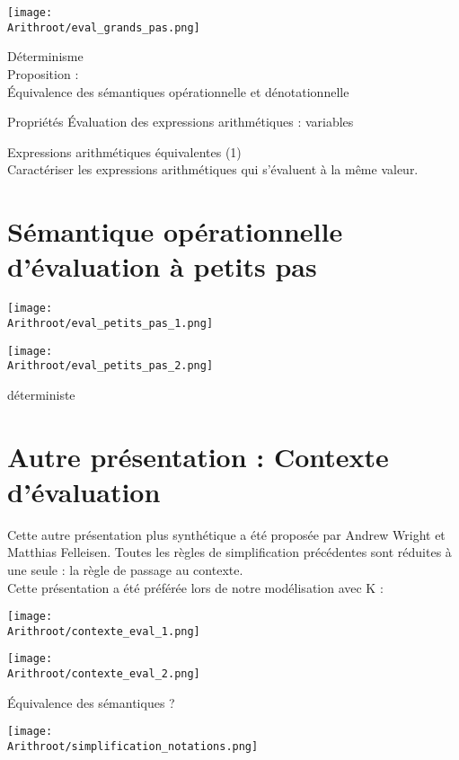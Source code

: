 \texttt{[image: \\Arithroot/eval\_grands\_pas.png]}

Déterminisme \\
Proposition : \\



Équivalence des sémantiques opérationnelle et
dénotationnelle

Propriétés Évaluation des expressions arithmétiques : variables

Expressions arithmétiques équivalentes (1) \\
Caractériser les expressions arithmétiques qui s’évaluent à la même valeur.



\section{Sémantique opérationnelle d’évaluation à petits pas}

\texttt{[image: \\Arithroot/eval\_petits\_pas\_1.png]}

\texttt{[image: \\Arithroot/eval\_petits\_pas\_2.png]}

déterministe


\section{Autre présentation : Contexte d'évaluation}

Cette autre présentation plus synthétique a été proposée par Andrew Wright et Matthias Felleisen.
Toutes les règles de simplification précédentes sont réduites à une seule : la règle de passage au contexte. \\

Cette présentation a été préférée lors de notre modélisation avec K :




\texttt{[image: \\Arithroot/contexte\_eval\_1.png]}

\texttt{[image: \\Arithroot/contexte\_eval\_2.png]}

Équivalence des sémantiques ?

\texttt{[image: \\Arithroot/simplification\_notations.png]}